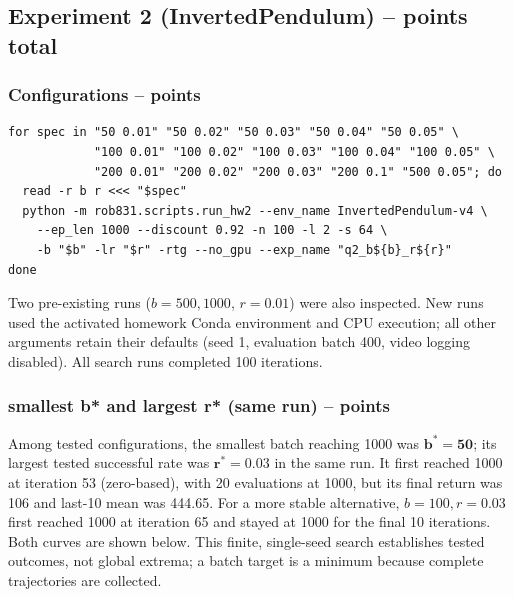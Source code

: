 \documentclass{article}
\begin{document}
\subsection{Experiment 2 (InvertedPendulum) --  points total\rbrack}

\subsubsection{Configurations --  points\rbrack}
\begin{answer}[title=Q5.2.1,height=10cm,width=\linewidth]
\begin{verbatim}
for spec in "50 0.01" "50 0.02" "50 0.03" "50 0.04" "50 0.05" \
            "100 0.01" "100 0.02" "100 0.03" "100 0.04" "100 0.05" \
            "200 0.01" "200 0.02" "200 0.03" "200 0.1" "500 0.05"; do
  read -r b r <<< "$spec"
  python -m rob831.scripts.run_hw2 --env_name InvertedPendulum-v4 \
    --ep_len 1000 --discount 0.92 -n 100 -l 2 -s 64 \
    -b "$b" -lr "$r" -rtg --no_gpu --exp_name "q2_b${b}_r${r}"
done
\end{verbatim}
Two pre-existing runs ($b=500,1000$, $r=0.01$) were also inspected.
New runs used the activated homework Conda environment and CPU execution;
all other arguments retain their defaults (seed 1, evaluation batch 400,
video logging disabled). All search runs completed 100 iterations.
\end{answer}

\subsubsection{smallest \textbf{b*} and largest \textbf{r*} (same run) --  points\rbrack}
\begin{answer}[title=Q5.2.2,height=4cm,width=\linewidth]
\small
Among tested configurations, the smallest batch reaching 1000 was
$\mathbf{b^*=50}$; its largest tested successful rate was
$\mathbf{r^*=0.03}$ in the same run. It first reached 1000 at iteration 53
(zero-based), with 20 evaluations at 1000, but its final return was 106
and last-10 mean was 444.65. For a more stable alternative, $b=100,r=0.03$
first reached 1000 at iteration 65 and stayed at 1000 for the final 10
iterations. Both curves are shown below. This finite, single-seed search
establishes tested outcomes, not global extrema; a batch target is a minimum
because complete trajectories are collected.
\end{answer}
\end{document}
